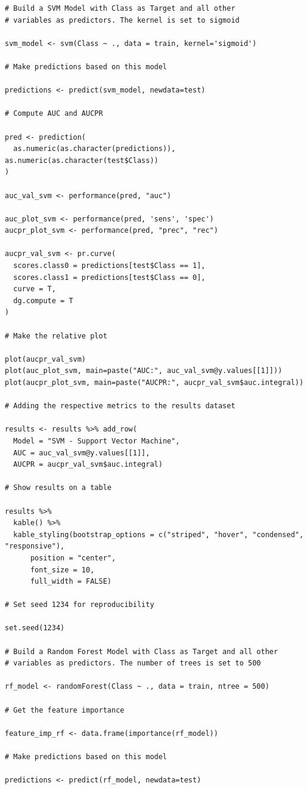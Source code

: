 \documentclass[]{article}
\begin{document}
\begin{verbatim}
# Build a SVM Model with Class as Target and all other
# variables as predictors. The kernel is set to sigmoid

svm_model <- svm(Class ~ ., data = train, kernel='sigmoid')

# Make predictions based on this model

predictions <- predict(svm_model, newdata=test)

# Compute AUC and AUCPR

pred <- prediction(
  as.numeric(as.character(predictions)),                                 as.numeric(as.character(test$Class))
)

auc_val_svm <- performance(pred, "auc")

auc_plot_svm <- performance(pred, 'sens', 'spec')
aucpr_plot_svm <- performance(pred, "prec", "rec")

aucpr_val_svm <- pr.curve(
  scores.class0 = predictions[test$Class == 1], 
  scores.class1 = predictions[test$Class == 0],
  curve = T,  
  dg.compute = T
)

# Make the relative plot

plot(aucpr_val_svm)
plot(auc_plot_svm, main=paste("AUC:", auc_val_svm@y.values[[1]]))
plot(aucpr_plot_svm, main=paste("AUCPR:", aucpr_val_svm$auc.integral))

# Adding the respective metrics to the results dataset

results <- results %>% add_row(
  Model = "SVM - Support Vector Machine",
  AUC = auc_val_svm@y.values[[1]],
  AUCPR = aucpr_val_svm$auc.integral)

# Show results on a table

results %>%
  kable() %>%
  kable_styling(bootstrap_options = c("striped", "hover", "condensed",           "responsive"),
      position = "center",
      font_size = 10,
      full_width = FALSE)
 
# Set seed 1234 for reproducibility

set.seed(1234)

# Build a Random Forest Model with Class as Target and all other
# variables as predictors. The number of trees is set to 500

rf_model <- randomForest(Class ~ ., data = train, ntree = 500)

# Get the feature importance

feature_imp_rf <- data.frame(importance(rf_model))

# Make predictions based on this model

predictions <- predict(rf_model, newdata=test)


\end{verbatim}
\end{document}
